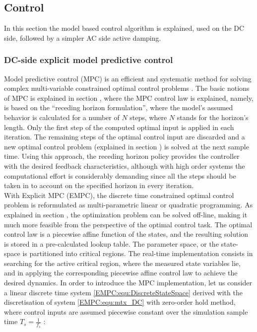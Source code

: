 \subsection{Control}\label{EMPC:sec:Control}

    In this section the model based control algorithm is explained, used on the DC side, followed by a simpler AC side active damping.

\subsubsection{DC-side explicit model predictive control} \label{EMPC:sec:DCside}

    Model predictive control (MPC) is an efficient and systematic method for solving complex multi-variable constrained optimal control problems \cite{vajda2017limiting}. The basic notions of MPC is explained in section , where the MPC control law is explained, namely, is based on the “receding horizon formulation”, where the model’s assumed behavior is calculated for a number of $N$ steps, where $N$ stands for the horizon’s length. Only the first step of the computed optimal input is applied in each iteration. The remaining steps of the optimal control input are discarded and a new optimal control problem (explained in section ) is solved at the next sample time. Using this approach, the receding horizon policy provides the controller with the desired feedback characteristics, although with high order systems the computational effort is considerably demanding since all the steps should be taken in to account on the specified horizon in every iteration.\\
		With Explicit MPC (EMPC), the discrete time constrained optimal control problem is reformulated as multi-parametric linear or quadratic programming. As explained in section , the optimization problem can be solved off-line, making it much more feasible from the perspective of the optimal control task. The optimal control law is a piecewise affine function of the states, and the resulting solution is stored in a pre-calculated lookup table. The parameter space, or the state-space is partitioned into critical regions. The real-time implementation consists in searching for the active critical region, where the measured state variables lie, and in applying the corresponding piecewise affine control law to achieve the desired dynamics.
    In order to introduce the MPC implementation, let us consider a linear discrete time system \ref{EMPC:equ:DiscreteStateSpace} derived with the discretisation of system \ref{EMPC:equ:mtx_DC} with zero-order hold method, where control inputs are assumed piecewise constant over the simulation sample time $T_s=\frac{1}{f_s}$ :

